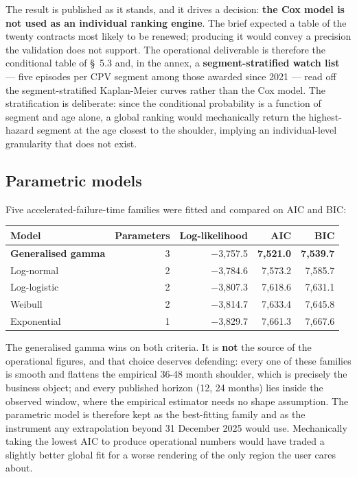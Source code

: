 The result is published as it stands, and it drives a decision: \textbf{the Cox model is not used as an individual ranking engine}. The brief expected a table of the twenty contracts most likely to be renewed; producing it would convey a precision the validation does not support. The operational deliverable is therefore the conditional table of \S~5.3 and, in the annex, a \textbf{segment-stratified watch list} --- five episodes per CPV segment among those awarded since 2021 --- read off the segment-stratified Kaplan-Meier curves rather than the Cox model. The stratification is deliberate: since the conditional probability is a function of segment and age alone, a global ranking would mechanically return the highest-hazard segment at the age closest to the shoulder, implying an individual-level granularity that does not exist.

\subsection{Parametric models}

Five accelerated-failure-time families \citep{kalbfleisch2002} were fitted and compared on AIC and BIC:

\begingroup\footnotesize
\begin{longtable}[]{@{}lrrrr@{}}
\toprule\noalign{}
Model & Parameters & Log-likelihood & AIC & BIC \\
\midrule\noalign{}
\endhead
\bottomrule\noalign{}
\endlastfoot
\textbf{Generalised gamma} & 3 & $-$3,757.5 & \textbf{7,521.0} & \textbf{7,539.7} \\
Log-normal & 2 & $-$3,784.6 & 7,573.2 & 7,585.7 \\
Log-logistic & 2 & $-$3,807.3 & 7,618.6 & 7,631.1 \\
Weibull & 2 & $-$3,814.7 & 7,633.4 & 7,645.8 \\
Exponential & 1 & $-$3,829.7 & 7,661.3 & 7,667.6 \\
\end{longtable}
\endgroup

The generalised gamma wins on both criteria. It is \textbf{not} the source of the operational figures, and that choice deserves defending: every one of these families is smooth and flattens the empirical 36-48 month shoulder, which is precisely the business object; and every published horizon (12, 24 months) lies inside the observed window, where the empirical estimator needs no shape assumption. The parametric model is therefore kept as the best-fitting family and as the instrument any extrapolation beyond 31 December 2025 would use. Mechanically taking the lowest AIC to produce operational numbers would have traded a slightly better global fit for a worse rendering of the only region the user cares about.

